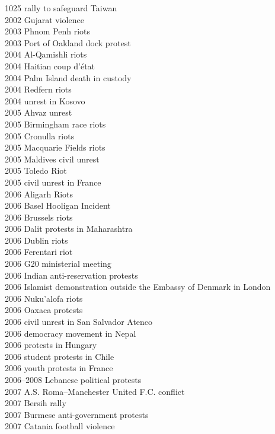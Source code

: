 1025 rally to safeguard Taiwan\\
2002 Gujarat violence\\
2003 Phnom Penh riots\\
2003 Port of Oakland dock protest\\
2004 Al-Qamishli riots\\
2004 Haitian coup d'état\\
2004 Palm Island death in custody\\
2004 Redfern riots\\
2004 unrest in Kosovo\\
2005 Ahvaz unrest\\
2005 Birmingham race riots\\
2005 Cronulla riots\\
2005 Macquarie Fields riots\\
2005 Maldives civil unrest\\
2005 Toledo Riot\\
2005 civil unrest in France\\
2006 Aligarh Riots\\
2006 Basel Hooligan Incident\\
2006 Brussels riots\\
2006 Dalit protests in Maharashtra\\
2006 Dublin riots\\
2006 Ferentari riot\\
2006 G20 ministerial meeting\\
2006 Indian anti-reservation protests\\
2006 Islamist demonstration outside the Embassy of Denmark in London\\
2006 Nuku'alofa riots\\
2006 Oaxaca protests\\
2006 civil unrest in San Salvador Atenco\\
2006 democracy movement in Nepal\\
2006 protests in Hungary\\
2006 student protests in Chile\\
2006 youth protests in France\\
2006–2008 Lebanese political protests\\
2007 A.S. Roma–Manchester United F.C. conflict\\
2007 Bersih rally\\
2007 Burmese anti-government protests\\
2007 Catania football violence\\

